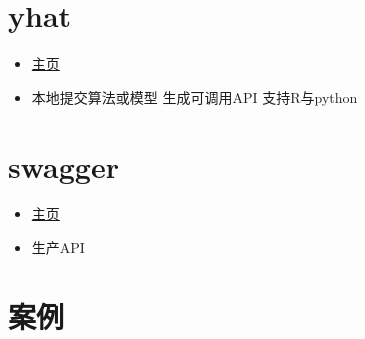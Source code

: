 \documentclass[]{book}
\providecommand{\tightlist}{%
  \setlength{\itemsep}{0pt}\setlength{\parskip}{0pt}}
\begin{document}
\hypertarget{yhat}{%
\section{yhat}\label{yhat}}

\begin{itemize}
\tightlist
\item
  \href{https://yhathq.com/}{主页}
\item
  本地提交算法或模型 生成可调用API 支持R与python
\end{itemize}

\hypertarget{swagger}{%
\section{swagger}\label{swagger}}

\begin{itemize}
\tightlist
\item
  \href{https://swagger.io/}{主页}
\item
  生产API
\end{itemize}

\section{案例}
\end{document}
